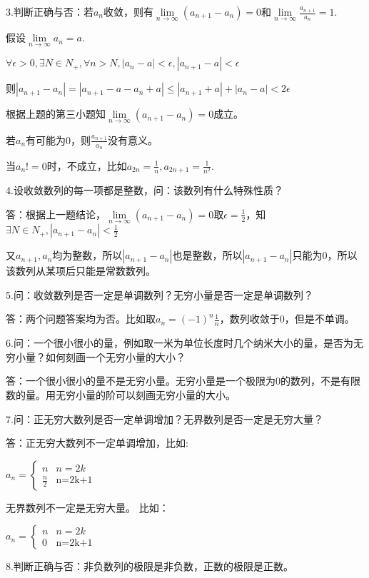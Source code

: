 \documentclass[12pt]{ctexart}
\begin{document}
3.判断正确与否：若${a_n}$收敛，则有$\lim\limits_{n\to\infty}(a_{n+1}-a_{n})=0$和$\lim\limits_{n\to\infty}\frac{a_{n+1}}{a_n}=1$.

假设$\lim\limits_{n\to\infty}a_n=a$.

$\forall\epsilon>0,\exists{N}\in{N_+},\forall{n}>N,|a_n-a|<\epsilon,|a_{n+1}-a|<\epsilon$

则$|a_{n+1}-a_{n}|=|a_{n+1}-a-a_{n}+a|\le|a_{n+1}+a|+|a_{n}-a|<2\epsilon$

根据上题的第三小题知$\lim\limits_{n\to\infty}(a_{n+1}-a_{n})=0$成立。

若$a_n$有可能为0，则$\frac{a_{n+1}}{a_n}$没有意义。

当$a_n!=0$时，不成立，比如$a_{2n}=\frac{1}{n}, a_{2n+1}=\frac{1}{n^2}$.

4.设收敛数列的每一项都是整数，问：该数列有什么特殊性质？

答：根据上一题结论，$\lim\limits_{n\to\infty}(a_{n+1}-a_n)=0$取$\epsilon=\frac{1}{2}$，知$\exists{N}\in{N_+},|a_{n+1}-a_n|<\frac{1}{2}$

又$a_{n+1},a_n$均为整数，所以$|a_{n+1}-a_n|$也是整数，所以$|a_{n+1}-a_n|$只能为0，所以该数列从某项后只能是常数数列。

5.问：收敛数列是否一定是单调数列？无穷小量是否一定是单调数列？

答：两个问题答案均为否。比如取$a_n=(-1)^n\frac{1}{n}$，数列收敛于0，但是不单调。


6.问：一个很小很小的量，例如取一米为单位长度时几个纳米大小的量，是否为无穷小量？如何刻画一个无穷小量的大小？

答：一个很小很小的量不是无穷小量。无穷小量是一个极限为0的数列，不是有限数的量。用无穷小量的阶可以刻画无穷小量的大小。

7.问：正无穷大数列是否一定单调增加？无界数列是否一定是无穷大量？

答：正无穷大数列不一定单调增加，比如:

$
a_n = \left\{ \begin{array}{ll}
n & \textrm{$n=2k$}\\
\frac{n}{2} & \textrm{n=2k+1}
\end{array} \right.
$

无界数列不一定是无穷大量。
比如：

$a_n = \left\{ \begin{array}{ll}n & \textrm{$n=2k$}\\0 & \textrm{n=2k+1}\end{array} \right.$

8.判断正确与否：非负数列的极限是非负数，正数的极限是正数。
\end{document}
